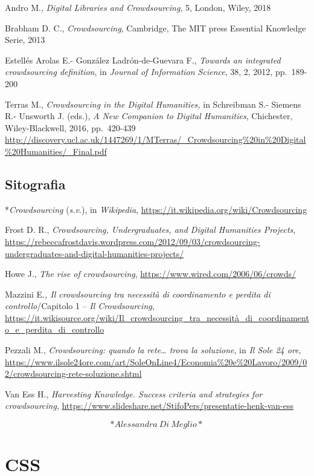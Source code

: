 \documentclass[
  b5paper,
  twoside,
  12pt,
  chapterprefix=false,
  bibliography=totocnumbered,
  parskip=false]{scrbook}
\begin{document}
Andro M., \emph{Digital Libraries and Crowdsourcing}, 5, London, Wiley, 2018

Brabham D. C., \emph{Crowdsourcing}, Cambridge, The MIT press Essential
Knowledge Serie, 2013

Estellés Arolas E.- González Ladrón-de-Guevara F., \emph{Towards an
integrated crowdsourcing definition}, in \emph{Journal of Information
Science}, 38, 2, 2012, pp.~189-200

Terras M., \emph{Crowdsourcing in the Digital Humanities,} in Schreibman S.-
Siemens R.- Unsworth J. (eds.), \emph{A New Companion to Digital Humanities},
Chichester, Wiley-Blackwell, 2016, pp.~420-439
\url{http://discovery.ucl.ac.uk/1447269/1/MTerras/_Crowdsourcing\%20in\%20Digital\%20Humanities/_Final.pdf}

\hypertarget{sitografia-5}{%
\section*{Sitografia}\label{sitografia-5}}

*\emph{Crowdsourcing} (\emph{s.v}.), in \emph{Wikipedia},
\url{https://it.wikipedia.org/wiki/Crowdsourcing}

Frost D. R., \emph{Crowdsourcing, Undergraduates, and Digital Humanities
Projects},
\url{https://rebeccafrostdavis.wordpress.com/2012/09/03/crowdsourcing-undergraduates-and-digital-humanities-projects/}

Howe J., \emph{The rise of crowdsourcing},
\url{https://www.wired.com/2006/06/crowds/}

Mazzini E.\emph{, Il crowdsourcing tra necessità di coordinamento e perdita
di controllo}/Capitolo 1 -- \emph{Il Crowdsourcing},
\url{https://it.wikisource.org/wiki/Il_crowdsourcing_tra_necessità_di_coordinamento_e_perdita_di_controllo}

Pezzali M., \emph{Crowdsourcing: quando la rete\ldots{} trova la soluzione}, in
\emph{Il Sole 24 ore},
\url{https://www.ilsole24ore.com/art/SoleOnLine4/Economia\%20e\%20Lavoro/2009/02/crowdsourcing-rete-soluzione.shtml}

Van Ess H., \emph{Harvesting Knowledge. Success criteria and strategies for
crowdsourcing},
\url{https://www.slideshare.net/StifoPers/presentatie-henk-van-ess}

\[*Alessandra~Di~Meglio*\]

\hypertarget{css}{%
\chapter{CSS}\label{css}}
\end{document}
